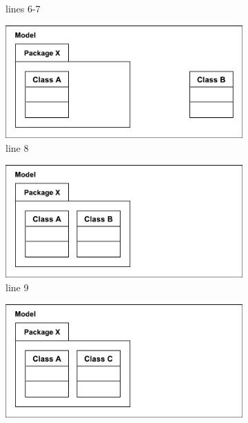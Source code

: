 \documentclass[10pt,conference]{IEEEtran}
\begin{document}
\begin{figure}[ht]
\begin{subfigure}[t]{0.49\linewidth}
        \caption{lines 6-7 }
        \label{fig:illustration_3}
    \end{subfigure}
    \hfill
    \begin{subfigure}[t]{0.49\linewidth}
        \centering
        \includegraphics[width=\linewidth]{images/illustration_4}
        \caption{line 8}
        \label{fig:illustration_4}
    \end{subfigure}
    \begin{subfigure}[t]{0.49\linewidth}
        \centering
        \includegraphics[width=\linewidth]{images/illustration_5}
        \caption{line 9}
        \label{fig:illustration_5}
    \end{subfigure}
    \hfill
    \begin{subfigure}[t]{0.49\linewidth}
        \centering
        \includegraphics[width=\linewidth]{images/illustration_6}

\end{subfigure}
\end{figure}
\end{document}
